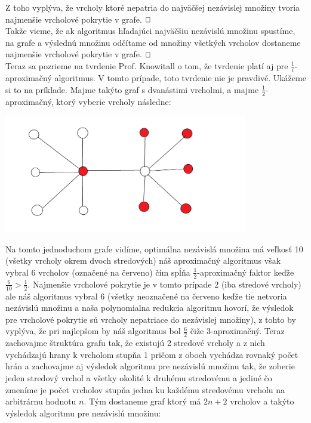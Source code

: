 \documentclass[a4paper]{article}
\begin{document}
Z toho vyplýva, že vrcholy ktoré nepatria do najväčšej nezávislej množiny tvoria najmenšie vrcholové pokrytie v grafe. $\oblong$
\\

Takže vieme, že ak algoritmus hľadajúci najväčšiu nezávislú množinu spustíme, na grafe a výslednú množinu odčítame od množiny všetkých vrcholov dostaneme najmenšie vrcholové pokrytie v grafe. $\oblong$
\\

Teraz sa pozrieme na tvrdenie Prof. Knowitall o tom, že tvrdenie platí aj pre $\frac{1}{i}$-aproximačný algoritmus. V tomto prípade, toto tvrdenie nie je pravdivé. Ukážeme si to na príklade. Majme takýto graf s dvanástimi vrcholmi, a majme $\frac{1}{2}$-aproximačný, ktorý vyberie vrcholy následne:


\centerline{\includegraphics[width=0.8\textwidth]{12}}

Na tomto jednoduchom grafe vidíme, optimálna nezávislá množina má veľkosť 10 (všetky vrcholy okrem dvoch stredových) náš aproximačný algoritmus však vybral 6 vrcholov (označené na červeno) čím spĺňa $\frac{1}{2}$-aproximačný faktor keďže $\frac{6}{10} > \frac{1}{2}$. Najmenšie vrcholové pokrytie je v tomto prípade 2 (iba stredové vrcholy) ale náš algoritmus vybral 6 (všetky neoznačené na červeno keďže tie netvoria nezávislú množinu a naša polynomialna redukcia algoritmu hovorí, že výsledok pre vrcholové pokrytie sú vrcholy nepatriace do nezávislej množiny), z tohto by vyplýva, že pri najlepšom by náš algoritmus bol $\frac{6}{2}$ čiže 3-aproximačný. Teraz zachovajme štruktúra grafu tak, že existujú 2 stredové vrcholy a z nich vychádzajú hrany k vrcholom stupňa 1 pričom z oboch vychádza rovnaký počet hrán a zachovajme aj výsledok algoritmu pre nezávislú množinu tak, že zoberie jeden stredový vrchol a všetky okolité k druhému stredovému a jediné čo zmeníme je počet vrcholov stupňa jedna ku každému stredovému vrcholu na arbitrárnu hodnotu $n$. Tým dostaneme graf ktorý má $2n+2$ vrcholov a takýto výsledok algoritmu pre nezávislú množinu:
\end{document}
